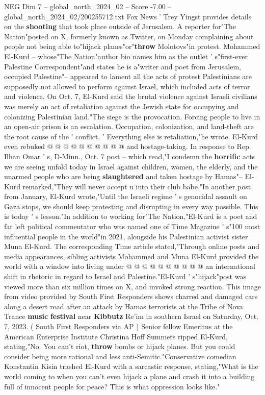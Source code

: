 \begin{textsample}{NEG Dim 7 – global\_north\_2024\_02 – Score -7.00 – global\_north\_2024\_02/200255712.txt}  \label{ex:f7_neg_283}
Fox News ' Trey Yingst provides details on the \textbf{shooting} that took place outside of Jerusalem.
A reporter for"The Nation"posted on X, formerly known as Twitter, on Monday complaining about people not being able to"hijack planes"or"\textbf{throw} Molotovs"in protest.
Mohammed El-Kurd -- whose"The Nation"author bio names him as the outlet ' s"first-ever Palestine Correspondent"and states he is a"writer and poet from Jerusalem, occupied Palestine"-- appeared to lament all the acts of protest Palestinians are supposedly not allowed to perform against Israel, which included acts of terror and violence.
On Oct. 7, El-Kurd said the brutal violence against Israeli civilians was merely an act of retaliation against the Jewish state for occupying and colonizing Palestinian land."The siege is the provocation.
Forcing people to live in an open-air prison is an escalation.
Occupation, colonization, and land-theft are the root cause of the ' conflict. ' Everything else is retaliation,"he wrote.
El-Kurd even rebuked @ @ @ @ @ @ @ @ @ @ and hostage-taking.
In response to Rep.
Ilhan Omar ' s, D-Minn., Oct. 7 post -- which read,"I condemn the \textbf{horrific} acts we are seeing unfold today in Israel against children, women, the elderly, and the unarmed people who are being \textbf{slaughtered} and taken hostage by Hamas"-- El-Kurd remarked,"They will never accept u into their club babe."In another post from January, El-Kurd wrote,"Until the Israeli regime ' s genocidal assault on Gaza stops, we should keep protesting and disrupting in every way possible.
This is today ' s lesson."In addition to working for"The Nation,"El-Kurd is a poet and far left political commentator who was named one of Time Magazine ' s"100 most influential people in the world"in 2021, alongside his Palestinian activist sister Muna El-Kurd.
The corresponding Time article stated,"Through online posts and media appearances, sibling activists Mohammed and Muna El-Kurd provided the world with a window into living under @ @ @ @ @ @ @ @ @ @ an international shift in rhetoric in regard to Israel and Palestine."El-Kurd ' s"hijack"post was viewed more than six million times on X, and invoked strong reaction.
This image from video provided by South First Responders shows charred and damaged cars along a desert road after an attack by Hamas terrorists at the Tribe of Nova Trance \textbf{music} \textbf{festival} near \textbf{Kibbutz} Re'im in southern Israel on Saturday, Oct. 7, 2023. ( South First Responders via AP ) Senior fellow Emeritus at the American Enterprise Institute Christina Hoff Summers ripped El-Kurd, stating,"No.
You can't riot, \textbf{throw} bombs or hijack planes.
But you could consider being more rational and less anti-Semitic."Conservative comedian Konstantin Kisin trashed El-Kurd with a sarcastic response, stating,"What is the world coming to when you can't even hijack a plane and crash it into a building full of innocent people for peace?
This is what oppression looks like."

\end{textsample}
